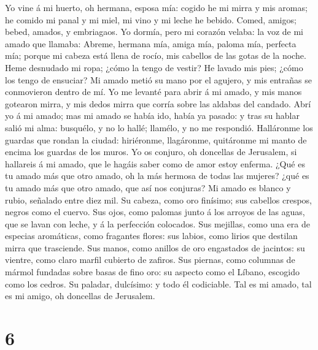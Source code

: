  Yo vine á mi huerto, oh hermana, esposa mía: cogido he mi
mirra y mis aromas; he comido mi panal y mi miel, mi vino y mi leche he
bebido. Comed, amigos; bebed, amados, y embriagaos.  Yo
dormía, pero mi corazón velaba: la voz de mi amado que llamaba: Abreme,
hermana mía, amiga mía, paloma mía, perfecta mía; porque mi cabeza está
llena de rocío, mis cabellos de las gotas de la noche. 
Heme desnudado mi ropa; ¿cómo la tengo de vestir? He lavado mis pies;
¿cómo los tengo de ensuciar?  Mi amado metió su mano por
el agujero, y mis entrañas se conmovieron dentro de mí. 
Yo me levanté para abrir á mi amado, y mis manos gotearon mirra, y mis
dedos mirra que corría sobre las aldabas del candado. 
Abrí yo á mi amado; mas mi amado se había ido, había ya pasado: y tras
su hablar salió mi alma: busquélo, y no lo hallé; llamélo, y no me
respondió.  Halláronme los guardas que rondan la ciudad:
hiriéronme, llagáronme, quitáronme mi manto de encima los guardas de los
muros.  Yo os conjuro, oh doncellas de Jerusalem, si
hallareis á mi amado, que le hagáis saber como de amor estoy enferma.
 ¿Qué es tu amado más que otro amado, oh la más hermosa de
todas las mujeres? ¿qué es tu amado más que otro amado, que así nos
conjuras?  Mi amado es blanco y rubio, señalado entre
diez mil.  Su cabeza, como oro finísimo; sus cabellos
crespos, negros como el cuervo.  Sus ojos, como palomas
junto á los arroyos de las aguas, que se lavan con leche, y á la
perfección colocados.  Sus mejillas, como una era de
especias aromáticas, como fragantes flores: sus labios, como lirios que
destilan mirra que trasciende.  Sus manos, como anillos
de oro engastados de jacintos: su vientre, como claro marfil cubierto de
zafiros.  Sus piernas, como columnas de mármol fundadas
sobre basas de fino oro: su aspecto como el Líbano, escogido como los
cedros.  Su paladar, dulcísimo: y todo él codiciable. Tal
es mi amado, tal es mi amigo, oh doncellas de Jerusalem.

\hypertarget{section-5}{%
\section{6}\label{section-5}}

